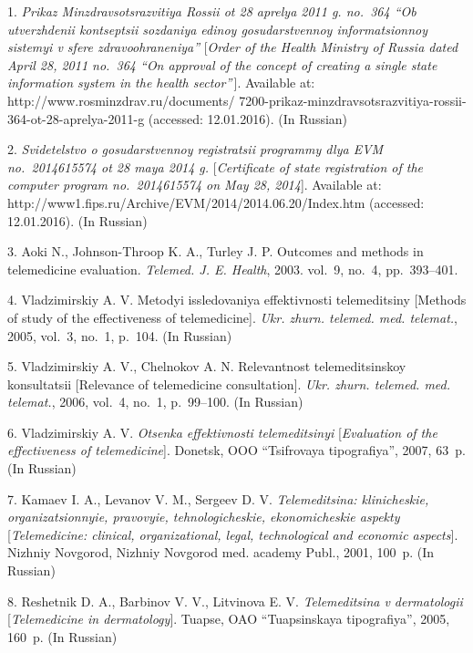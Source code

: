 


{\footnotesize

\vskip 3mm


\vskip 2mm


1. {\it Prikaz Minzdravsotsrazvitiya Rossii ot 28 aprelya 2011 g.
no.~364 ``Ob utverzhdenii kontseptsii sozdaniya edinoy
gosudarstvennoy informatsionnoy sistemyi v sfere
zdravoohraneniya''} [{\it Order of the Health Ministry of Russia
dated April 28, 2011 no.~364 ``On approval of the concept of
creating a single state information system in the health
sector''}\,]. Available at: http://www.rosminzdrav.ru/documents/
7200-prikaz-minzdravsotsrazvitiya-rossii-364-ot-28-aprelya-2011-g
(accessed: 12.01.2016). (In Russian)


2. {\it Svidetelstvo o gosudarstvennoy registratsii programmy dlya
EVM no.~2014615574 ot 28 maya 2014 g.} [{\it Certificate of state
registration of the computer program no.~2014615574 on May 28,
2014}]. Available at:
http://www1.fips.ru/Archive/EVM/2014/2014.06.20/Index.htm
(accessed: 12.01.2016). (In Russian)

3.   Aoki N.,  Johnson-Throop K. A.,  Turley J. P. Outcomes and
methods in telemedicine evaluation. {\it Telemed. J. E. Health},
2003. vol.~9,  no.~4,   pp.~393--401.

4.  Vladzimirskiy A. V. Metodyi issledovaniya effektivnosti
telemeditsiny [Methods of study of the effectiveness of
telemedicine]. {\it Ukr. zhurn. telemed. med. telemat.}, 2005,
vol.~3, no.~1, p.~104. (In Russian)


5.  Vladzimirskiy A. V., Chelnokov A. N. Relevantnost
telemeditsinskoy konsultatsii [Relevance of telemedicine
consultation]. {\it Ukr. zhurn. telemed. med. telemat.}, 2006,
vol.~4, no.~1, p.~99--100. (In Russian)


6.  Vladzimirskiy A. V. {\it Otsenka effektivnosti telemeditsinyi}
[{\it Evaluation of the effectiveness of telemedicine}]. Donetsk,
OOO ``Tsifrovaya tipografiya'', 2007, 63~p. (In Russian)


7.  Kamaev I. A., Levanov V. M., Sergeev D. V. {\it Telemeditsina:
klinicheskie, organizatsionnyie, pravovyie, tehnologicheskie,
ekonomicheskie aspekty} [{\it Telemedicine: clinical,
organizational, legal, technological and economic aspects}].
Nizhniy Novgorod, Nizhniy Novgorod med. academy Publ., 2001,
100~p. (In Russian)


8.  Reshetnik D. A., Barbinov V. V., Litvinova E. V. {\it
Telemeditsina v dermatologii} [{\it Telemedicine in dermatology}].
Tuapse, OAO ``Tuapsinskaya tipografiya'', 2005, 160~p. (In
Russian)




}
